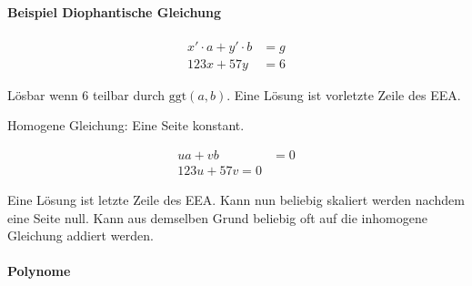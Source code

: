 \documentclass{article}
\begin{document}
\paragraph{Beispiel Diophantische Gleichung}

\begin{align*}
    x' \cdot a + y' \cdot b &= g \\
    123x + 57y &= 6
\end{align*}

Lösbar wenn 6 teilbar durch $\text{ggt}(a, b)$. Eine Lösung ist vorletzte Zeile des EEA.

Homogene Gleichung: Eine Seite konstant.

\begin{align*}
    ua + vb &= 0 \\
    123u + 57v = 0
\end{align*}

Eine Lösung ist letzte Zeile des EEA. Kann nun beliebig skaliert werden nachdem eine Seite null. Kann aus demselben Grund beliebig oft auf die inhomogene Gleichung addiert werden.

\paragraph{Polynome}
\end{document}
